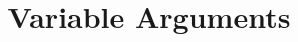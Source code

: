 \documentclass{article}
\begin{document}
\title{Variable Arguments}
\author{}
\date{}
\maketitle


\end{document}
